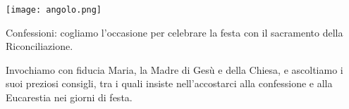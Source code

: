 \begin{center}
\vspace{1em}

\begin{minipage}{0.25\textwidth}
\texttt{[image: angolo.png]}
\end{minipage}
\hfill
\begin{minipage}{0.72\textwidth}
Confessioni: cogliamo l’occasione per celebrare la festa con il sacramento della Riconciliazione.

Invochiamo con fiducia Maria, la Madre di Gesù e della Chiesa, e ascoltiamo i suoi preziosi consigli, tra i quali insiste nell’accostarci alla confessione e alla Eucarestia nei giorni di festa.
\end{minipage}

\end{center}


\normalsize
